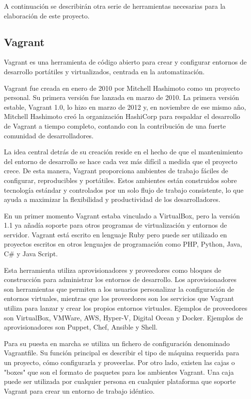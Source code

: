 A continuación se describirán otra serie de herramientas necesarias para la elaboración de este proyecto.

\subsection{Vagrant}

Vagrant es una herramienta de código abierto para crear y configurar entornos de desarrollo portátiles y virtualizados, centrada en la automatización.

Vagrant fue creada en enero de 2010 por Mitchell Hashimoto como un proyecto personal. Su primera versión fue lanzada en marzo de 2010. La primera versión estable, Vagrant 1.0, lo hizo en marzo de 2012 y, en noviembre de ese mismo año, Mitchell Hashimoto creó la organización HashiCorp para respaldar el desarrollo de Vagrant a tiempo completo, contando con la contribución de una fuerte comunidad de desarrolladores.

La idea central detrás de su creación reside en el hecho de que el mantenimiento del entorno de desarrollo se hace cada vez más difícil a medida que el proyecto crece. De esta manera, Vagrant proporciona ambientes de trabajo fáciles de configurar, reproducibles y portátiles. Estos ambientes están construidos sobre tecnología estándar y controlados por un solo flujo de trabajo consistente, lo que ayuda a maximizar la flexibilidad y productividad de los desarrolladores.

En un primer momento Vagrant estaba vinculado a VirtualBox, pero la versión 1.1 ya añadía soporte para otros programas de virtualización y entornos de servidor. Vagrant está escrito en lenguaje Ruby pero puede ser utilizado en proyectos escritos en otros lenguajes de programación como PHP, Python, Java, C\# y Java Script.

Esta herramienta utiliza aprovisionadores y proveedores como bloques de construcción para administrar los entornos de desarrollo. Los aprovisionadores son herramientas que permiten a los usuarios personalizar la configuración de entornos virtuales, mientras que los proveedores son los servicios que Vagrant utiliza para lanzar y crear los propios entornos virtuales. Ejemplos de proveedores son VirtualBox, VMWare, AWS, Hyper-V, Digital Ocean y Docker. Ejemplos de aprovisionadores son Puppet, Chef, Ansible y Shell.

Para su puesta en marcha se utiliza un fichero de configuración denominado Vagrantfile. Su función principal es describir el tipo de máquina requerida para un proyecto, cómo configurarla y proveerlas. Por otro lado, existen las cajas o "boxes" que son el formato de paquetes para los ambientes Vagrant. Una caja puede ser utilizada por cualquier persona en cualquier plataforma que soporte Vagrant para crear un entorno de trabajo idéntico.


